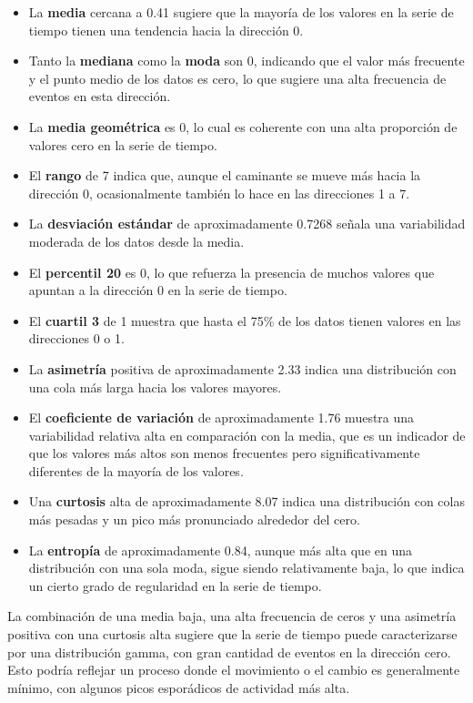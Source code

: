 \documentclass[11pt]{article} %
\begin{document}
	\begin{itemize}
		\item La \textbf{media} cercana a 0.41 sugiere que la mayoría de los valores en la serie de tiempo tienen una tendencia hacia la dirección 0.
		\item Tanto la \textbf{mediana} como la \textbf{moda} son 0, indicando que el valor más frecuente y el punto medio de los datos es cero, lo que sugiere una alta frecuencia de eventos en esta dirección.
		\item La \textbf{media geométrica} es 0, lo cual es coherente con una alta proporción de valores cero en la serie de tiempo.
		\item El \textbf{rango} de 7 indica que, aunque el caminante se mueve más hacia la dirección 0, ocasionalmente también lo hace en las direcciones 1 a 7.
		\item La \textbf{desviación estándar} de aproximadamente 0.7268 señala una variabilidad moderada de los datos desde la media.
		\item El \textbf{percentil 20} es 0, lo que refuerza la presencia de muchos valores que apuntan a la dirección 0 en la serie de tiempo.
		\item El \textbf{cuartil 3} de 1 muestra que hasta el 75\% de los datos tienen valores en las direcciones 0 o 1.
		\item La \textbf{asimetría} positiva de aproximadamente 2.33 indica una distribución con una cola más larga hacia los valores mayores.
		\item El \textbf{coeficiente de variación} de aproximadamente 1.76 muestra una variabilidad relativa alta en comparación con la media, que es un indicador de que los valores más altos son menos frecuentes pero significativamente diferentes de la mayoría de los valores.
		\item Una \textbf{curtosis} alta de aproximadamente 8.07 indica una distribución con colas más pesadas y un pico más pronunciado alrededor del cero.
		\item La \textbf{entropía} de aproximadamente 0.84, aunque más alta que en una distribución con una sola moda, sigue siendo relativamente baja, lo que indica un cierto grado de regularidad en la serie de tiempo.
	\end{itemize}
	
	La combinación de una media baja, una alta frecuencia de ceros y una asimetría positiva con una curtosis alta sugiere que la serie de tiempo puede caracterizarse por una distribución gamma, con gran cantidad de eventos en la dirección cero. Esto podría reflejar un proceso donde el movimiento o el cambio es generalmente mínimo, con algunos picos esporádicos de actividad más alta.
	
\end{document}
